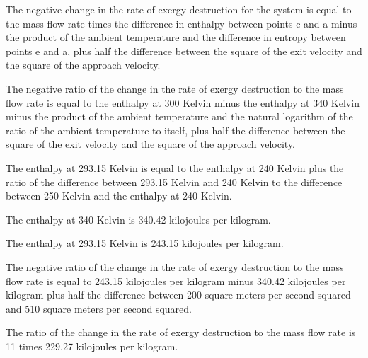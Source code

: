 The negative change in the rate of exergy destruction for the system is equal to the mass flow rate times the difference in enthalpy between points c and a minus the product of the ambient temperature and the difference in entropy between points e and a, plus half the difference between the square of the exit velocity and the square of the approach velocity.

The negative ratio of the change in the rate of exergy destruction to the mass flow rate is equal to the enthalpy at 300 Kelvin minus the enthalpy at 340 Kelvin minus the product of the ambient temperature and the natural logarithm of the ratio of the ambient temperature to itself, plus half the difference between the square of the exit velocity and the square of the approach velocity.

The enthalpy at 293.15 Kelvin is equal to the enthalpy at 240 Kelvin plus the ratio of the difference between 293.15 Kelvin and 240 Kelvin to the difference between 250 Kelvin and the enthalpy at 240 Kelvin.

The enthalpy at 340 Kelvin is 340.42 kilojoules per kilogram.

The enthalpy at 293.15 Kelvin is 243.15 kilojoules per kilogram.

The negative ratio of the change in the rate of exergy destruction to the mass flow rate is equal to 243.15 kilojoules per kilogram minus 340.42 kilojoules per kilogram plus half the difference between 200 square meters per second squared and 510 square meters per second squared.

The ratio of the change in the rate of exergy destruction to the mass flow rate is 11 times 229.27 kilojoules per kilogram.